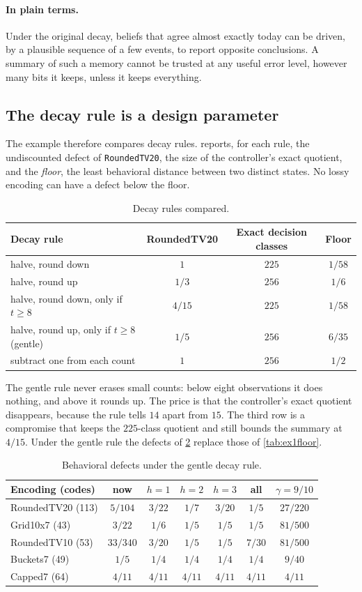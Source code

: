 \documentclass[11pt]{article}
\newcommand{\code}[1]{\texttt{#1}}
\newcommand{\plain}{\paragraph{In plain terms.}}
\theoremstyle{definition}
\theoremstyle{plain}
\begin{document}
\plain Under the original decay, beliefs that agree almost exactly today can be driven, by a
plausible sequence of a few events, to report opposite conclusions. A summary of such a memory
cannot be trusted at any useful error level, however many bits it keeps, unless it keeps
everything.

\subsection{The decay rule is a design parameter}

The example therefore compares decay rules.  reports, for each rule, the
undiscounted defect of \code{RoundedTV20}, the size of the controller's exact quotient, and the
\emph{floor}, the least behavioral distance between two distinct states. No lossy encoding can have a
defect below the floor.

\begin{table}[ht]
\centering\small
\begin{tabular}{lccc}
\toprule
Decay rule & RoundedTV20 & Exact decision classes & Floor\\
\midrule
halve, round down & $1$ & $225$ & $1/58$\\
halve, round up & $1/3$ & $256$ & $1/6$\\
halve, round down, only if $t\ge8$ & $4/15$ & $225$ & $1/58$\\
halve, round up, only if $t\ge8$ (gentle) & $1/5$ & $256$ & $6/35$\\
subtract one from each count & $1$ & $256$ & $1/2$\\
\bottomrule
\end{tabular}
\caption{Decay rules compared.}\label{tab:ex1decay}
\end{table}

The gentle rule never erases small counts: below eight observations it does nothing, and above it
rounds up. The price is that the controller's exact quotient disappears, because the rule tells
$14$ apart from $15$. The third row is a compromise that keeps the $225$-class quotient and still
bounds the summary at $4/15$. Under the gentle rule the defects of \cref{tab:ex1gentle} replace those
of \cref{tab:ex1floor}.

\begin{table}[ht]
\centering\small
\begin{tabular}{lcccccc}
\toprule
Encoding (codes) & now & $h=1$ & $h=2$ & $h=3$ & all & $\gamma=9/10$\\
\midrule
RoundedTV20 (113) & $5/104$ & $3/22$ & $1/7$ & $3/20$ & $1/5$ & $27/220$\\
Grid10x7 (43) & $3/22$ & $1/6$ & $1/5$ & $1/5$ & $1/5$ & $81/500$\\
RoundedTV10 (53) & $33/340$ & $3/20$ & $1/5$ & $1/5$ & $7/30$ & $81/500$\\
Buckets7 (49) & $1/5$ & $1/4$ & $1/4$ & $1/4$ & $1/4$ & $9/40$\\
Capped7 (64) & $4/11$ & $4/11$ & $4/11$ & $4/11$ & $4/11$ & $4/11$\\
\bottomrule
\end{tabular}
\caption{Behavioral defects under the gentle decay rule.}\label{tab:ex1gentle}
\end{table}
\end{document}

